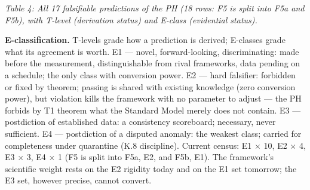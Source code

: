 \documentclass[11pt,letterpaper]{article}
\begin{document}
\begin{footnotesize}
\end{footnotesize}

\begingroup\centering\footnotesize\itshape Table 4: All 17 falsifiable predictions of the PH (18 rows: F5 is split into F5a and F5b), with T-level (derivation status) and E-class (evidential status).\par\endgroup

\noindent \textbf{E-classification. }T-levels grade how a prediction is derived; E-classes grade what its agreement is worth. E1 --- novel, forward-looking, discriminating: made before the measurement, distinguishable from rival frameworks, data pending on a schedule; the only class with conversion power. E2 --- hard falsifier: forbidden or fixed by theorem; passing is shared with existing knowledge (zero conversion power), but violation kills the framework with no parameter to adjust --- the PH forbids by T1 theorem what the Standard Model merely does not contain. E3 --- postdiction of established data: a consistency scoreboard; necessary, never sufficient. E4 --- postdiction of a disputed anomaly: the weakest class; carried for completeness under quarantine (K.8 discipline). Current census: E1 $\times$ 10, E2 $\times$ 4, E3 $\times$ 3, E4 $\times$ 1 (F5 is split into F5a, E2, and F5b, E1). The framework's scientific weight rests on the E2 rigidity today and on the E1 set tomorrow; the E3 set, however precise, cannot convert.
\end{document}
